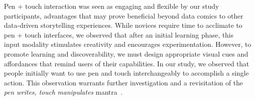 



\vspace{2mm}
 Pen + touch interaction was seen as engaging and flexible by our study participants, advantages that may prove beneficial beyond data comics to other data-driven storytelling experiences. While novices require time to acclimate to pen + touch interfaces, we observed that after an initial learning phase, this input modality stimulates creativity and encourages experimentation. However, to promote learning and discoverability, we must design appropriate visual cues and affordances that remind users of their capabilities. In our study, we observed that people initially want to use pen and touch interchangeably to accomplish a single action. This observation warrants further investigation and a revisitation of the {\it pen writes, touch manipulates} mantra~\cite{hinckley2010pen}.

